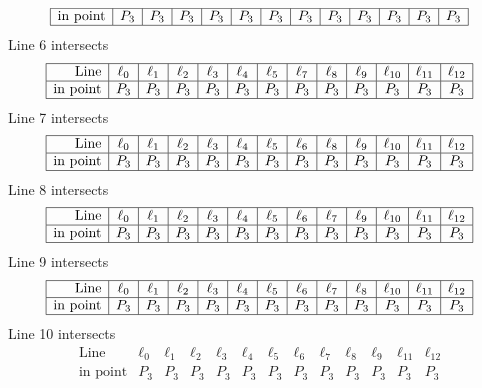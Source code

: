 \documentclass{article}
\begin{document}
{$$\begin{array}{|r*{12}{|c}|}
\hline
\mbox{in point}  & P_{3} & P_{3} & P_{3} & P_{3} & P_{3} & P_{3} & P_{3} & P_{3} & P_{3} & P_{3} & P_{3} & P_{3}\\
\hline
\end{array}
$$
Line 6 intersects 
$$
\begin{array}{|r*{12}{|c}|}
\hline
\mbox{Line}  & \ell_{0} & \ell_{1} & \ell_{2} & \ell_{3} & \ell_{4} & \ell_{5} & \ell_{7} & \ell_{8} & \ell_{9} & \ell_{10} & \ell_{11} & \ell_{12}\\
\hline
\mbox{in point}  & P_{3} & P_{3} & P_{3} & P_{3} & P_{3} & P_{3} & P_{3} & P_{3} & P_{3} & P_{3} & P_{3} & P_{3}\\
\hline
\end{array}
$$
Line 7 intersects 
$$
\begin{array}{|r*{12}{|c}|}
\hline
\mbox{Line}  & \ell_{0} & \ell_{1} & \ell_{2} & \ell_{3} & \ell_{4} & \ell_{5} & \ell_{6} & \ell_{8} & \ell_{9} & \ell_{10} & \ell_{11} & \ell_{12}\\
\hline
\mbox{in point}  & P_{3} & P_{3} & P_{3} & P_{3} & P_{3} & P_{3} & P_{3} & P_{3} & P_{3} & P_{3} & P_{3} & P_{3}\\
\hline
\end{array}
$$
Line 8 intersects 
$$
\begin{array}{|r*{12}{|c}|}
\hline
\mbox{Line}  & \ell_{0} & \ell_{1} & \ell_{2} & \ell_{3} & \ell_{4} & \ell_{5} & \ell_{6} & \ell_{7} & \ell_{9} & \ell_{10} & \ell_{11} & \ell_{12}\\
\hline
\mbox{in point}  & P_{3} & P_{3} & P_{3} & P_{3} & P_{3} & P_{3} & P_{3} & P_{3} & P_{3} & P_{3} & P_{3} & P_{3}\\
\hline
\end{array}
$$
Line 9 intersects 
$$
\begin{array}{|r*{12}{|c}|}
\hline
\mbox{Line}  & \ell_{0} & \ell_{1} & \ell_{2} & \ell_{3} & \ell_{4} & \ell_{5} & \ell_{6} & \ell_{7} & \ell_{8} & \ell_{10} & \ell_{11} & \ell_{12}\\
\hline
\mbox{in point}  & P_{3} & P_{3} & P_{3} & P_{3} & P_{3} & P_{3} & P_{3} & P_{3} & P_{3} & P_{3} & P_{3} & P_{3}\\
\hline
\end{array}
$$
Line 10 intersects 
$$
\begin{array}{|r*{12}{|c}|}
\hline
\mbox{Line}  & \ell_{0} & \ell_{1} & \ell_{2} & \ell_{3} & \ell_{4} & \ell_{5} & \ell_{6} & \ell_{7} & \ell_{8} & \ell_{9} & \ell_{11} & \ell_{12}\\
\hline
\mbox{in point}  & P_{3} & P_{3} & P_{3} & P_{3} & P_{3} & P_{3} & P_{3} & P_{3} & P_{3} & P_{3} & P_{3} & P_{3}\\

\end{array}$$}
\end{document}
